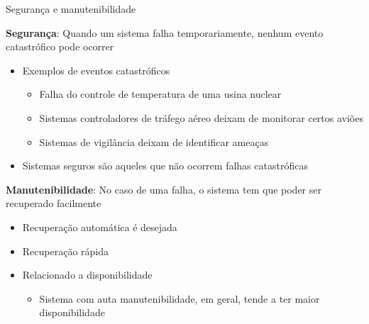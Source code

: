 \documentclass[compress]{beamer}
\begin{document}
\begin{frame}{Segurança e manutenibilidade}

\textbf{Segurança}: Quando um sistema falha temporariamente, nenhum evento catastrófico pode ocorrer
\begin{itemize}
    \item Exemplos de eventos catastróficos
    \begin{itemize}
        \item Falha do controle de temperatura de uma usina nuclear
        \item Sistemas controladores de tráfego aéreo deixam de monitorar certos aviões
        \item Sistemas de vigilância deixam de identificar ameaças
    \end{itemize}
    \item Sistemas seguros são aqueles que não ocorrem falhas catastróficas
\end{itemize}

\vspace{0.25cm}

\textbf{Manutenibilidade}: No caso de uma falha, o sistema tem que poder ser recuperado facilmente
\begin{itemize}
    \item Recuperação automática é desejada
    \item Recuperação rápida
    \item Relacionado a disponibilidade
    \begin{itemize}
        \item Sistema com auta manutenibilidade, em geral, tende a ter maior disponibilidade
    \end{itemize}
\end{itemize}

\end{frame}

\end{document}
